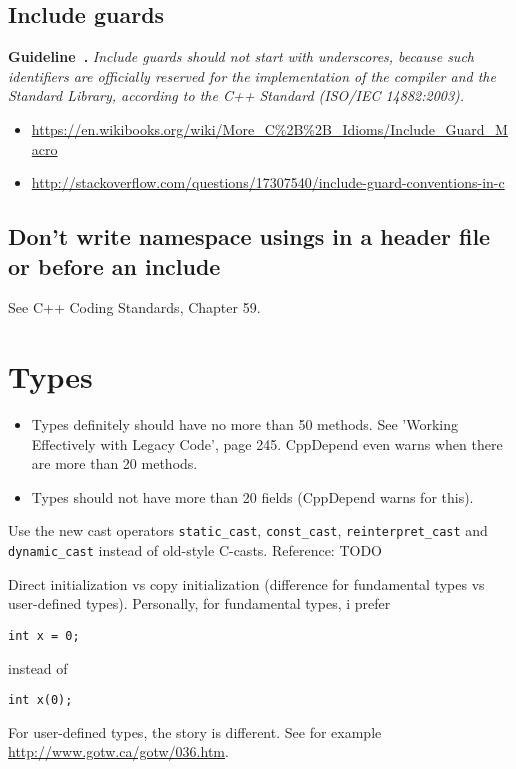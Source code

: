 \documentclass{article}
\newcounter{guideline}
\newenvironment{guideline}[1][]{\refstepcounter{guideline}\par\medskip
   \noindent \textbf{Guideline~\theguideline. #1} \em \rmfamily}{\medskip}
\begin{document}
\subsection{Include guards}

\begin{guideline}
Include guards should not start with underscores, because such identifiers are officially reserved for the implementation of the compiler and the Standard Library, according to the C++ Standard (ISO/IEC 14882:2003).
\end{guideline}
\begin{itemize}
\item \url{https://en.wikibooks.org/wiki/More_C%2B%2B_Idioms/Include_Guard_Macro}
\item \url{http://stackoverflow.com/questions/17307540/include-guard-conventions-in-c}
\end{itemize}

\subsection{Don't write namespace usings in a header file or before an include}
See C++ Coding Standards, Chapter 59.

\section{Types}

\begin{itemize}
\item Types definitely should have no more than 50 methods.
See 'Working Effectively with Legacy Code', page 245.
CppDepend even warns when there are more than 20 methods.
\item Types should not have more than 20 fields (CppDepend warns for this).
\end{itemize}

Use the new cast operators \lstinline{static_cast}, \lstinline{const_cast}, \lstinline{reinterpret_cast} and \lstinline{dynamic_cast} instead of old-style C-casts.
Reference: TODO

Direct initialization vs copy initialization (difference for fundamental types vs user-defined types).  Personally, for fundamental types, i prefer
\begin{lstlisting}
int x = 0;
\end{lstlisting}
instead of
\begin{lstlisting}
int x(0);
\end{lstlisting}
For user-defined types, the story is different.  See for example \url{http://www.gotw.ca/gotw/036.htm}.
\end{document}
